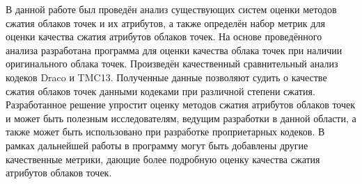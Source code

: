 В данной работе был проведён анализ существующих систем оценки методов сжатия
облаков точек и их атрибутов, а также определён набор метрик для оценки качества
сжатия атрибутов облаков точек. На основе проведённого анализа разработана
программа для оценки качества облака точек при наличии оригинального облака
точек. Произведён качественный сравнительный анализ кодеков Draco и TMC13.
Полученные данные позволяют судить о качестве сжатия облаков точек данными
кодеками при различной степени сжатия. Разработанное решение упростит оценку
методов сжатия атрибутов облаков точек и может быть полезным исследователям,
ведущим разработки в данной области, а также может быть использовано при
разработке проприетарных кодеков. В рамках дальнейшей работы в программу могут
быть добавлены другие качественные метрики, дающие более подробную оценку
качества сжатия атрибутов облаков точек.
